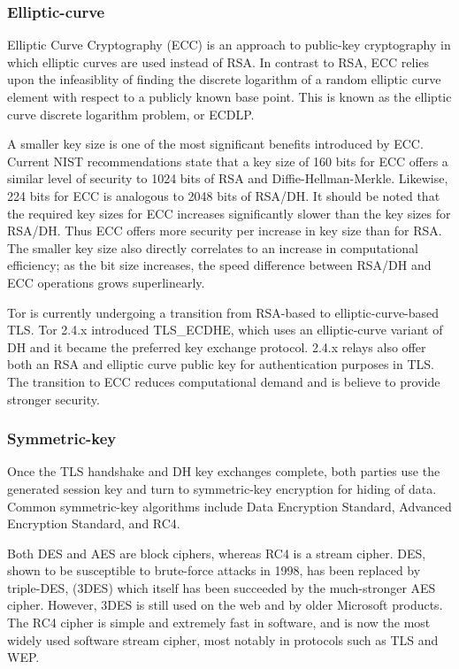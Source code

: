 \documentclass[journal]{IEEEtran}
\begin{document}
\subsubsection{Elliptic-curve}

Elliptic Curve Cryptography (ECC) is an approach to public-key cryptography in which elliptic curves are used instead of RSA. In contrast to RSA, ECC relies upon the infeasiblity of finding the discrete logarithm of a random elliptic curve element with respect to a publicly known base point. This is known as the elliptic curve discrete logarithm problem, or ECDLP.

A smaller key size is one of the most significant benefits introduced by ECC. Current NIST recommendations state that a key size of 160 bits for ECC offers a similar level of security to 1024 bits of RSA and Diffie-Hellman-Merkle. Likewise, 224 bits for ECC is analogous to 2048 bits of RSA/DH. It should be noted that the required key sizes for ECC increases significantly slower than the key sizes for RSA/DH. Thus ECC offers more security per increase in key size than for RSA. The smaller key size also directly correlates to an increase in computational efficiency; as the bit size increases, the speed difference between RSA/DH and ECC operations grows superlinearly.\cite{CaseForECC}

Tor is currently undergoing a transition from RSA-based to elliptic-curve-based TLS. Tor 2.4.x introduced TLS\_ECDHE, which uses an elliptic-curve variant of DH and it became the preferred key exchange protocol. 2.4.x relays also offer both an RSA and elliptic curve public key for authentication purposes in TLS. The transition to ECC reduces computational demand and is believe to provide stronger security.

\subsubsection{Symmetric-key}


Once the TLS handshake and DH key exchanges complete, both parties use the generated session key and turn to symmetric-key encryption for hiding of data. Common symmetric-key algorithms include Data Encryption Standard, Advanced Encryption Standard, and RC4.

Both DES and AES are block ciphers, whereas RC4 is a stream cipher. DES, shown to be susceptible to brute-force attacks in 1998, has been replaced by triple-DES, (3DES) which itself has been succeeded by the much-stronger AES cipher. However, 3DES is still used on the web and by older Microsoft products.\cite{NIST2007}\cite{Bogdanov2011}\cite{Nikolic2009} The RC4 cipher is simple and extremely fast in software, and is now the most widely used software stream cipher, most notably in protocols such as TLS and WEP.
\end{document}
